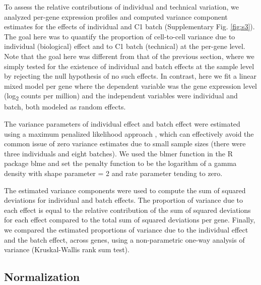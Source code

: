 To assess the relative contributions of individual and technical
variation, we analyzed per-gene expression profiles and computed
variance component estimates for the effects of individual and C1 batch
(Supplementary Fig. \ref{fig:s3}). The goal here was to quantify the proportion of
cell-to-cell variance due to individual (biological) effect and to C1
batch (technical) at the per-gene level. Note that the goal here was
different from that of the previous section, where we simply tested for
the existence of individual and batch effects at the sample level by
rejecting the null hypothesis of no such effects. In contrast, here we
fit a linear mixed model per gene where the dependent variable was the
gene expression level (log\textsubscript{2} counts per million) and the
independent variables were individual and batch, both modeled as random
effects.

The variance parameters of individual effect and batch effect were
estimated using a maximum penalized likelihood approach
\citep{Chung2013}, which can effectively avoid the common issue of zero
variance estimates due to small sample sizes (there were three
individuals and eight batches). We used the blmer function in the R
package blme and set the penalty function to be the logarithm of a gamma
density with shape parameter = 2 and rate parameter tending to zero.

The estimated variance components were used to compute the sum of
squared deviations for individual and batch effects. The proportion of
variance due to each effect is equal to the relative contribution of the
sum of squared deviations for each effect compared to the total sum of
squared deviations per gene. Finally, we compared the estimated
proportions of variance due to the individual effect and the batch
effect, across genes, using a non-parametric one-way analysis of
variance (Kruskal-Wallis rank sum test).

\subsection{Normalization}\label{normalization}

